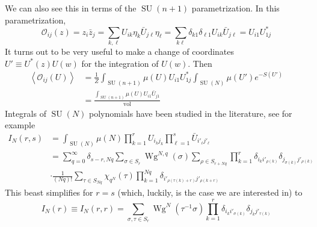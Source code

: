 \documentclass[a4paper,11pt]{article}
\theoremstyle{definition}
\DeclareMathOperator{\SU}{SU}
\DeclareMathOperator{\vol}{vol}
\DeclareMathOperator{\Wg}{Wg}
\newcommand{\OO}{\mathcal O}
\begin{document}
We can also see this in terms of the $\SU(n+1)$ parametrization.
In this parametrization, 
\begin{equation}
  \OO_{ij}(z) = z_i \bar z_j = \sum_{k,\ell} U_{ik} \eta_k \bar U_{j\ell} \eta_{\ell} = \sum_{k\ell} \delta_{k 1}\delta_{\ell 1} U_{ik}\bar U_{j\ell} = U_{i1}U^*_{1j}
\end{equation}
It turns out to be very useful to make a change of coordinates $U' \equiv U^*(z)U(w)$ for the integration of $U(w)$.
Then
\begin{equation}
  \begin{split} 
    \left\langle \OO_{ij}(U) \right\rangle &= \frac{1}{Z} \int_{\SU(n+1)}\mu(U) U_{i1}U^*_{1j} \int_{\SU(N)} \mu(U') e^{-S(U')} \\
    &= \frac{\int_{\SU(n+1)}\mu(U) U_{i1}\bar U_{j1}}{\vol}
  \end{split}
  \label{eq:toy_one_pt_from_SU}
\end{equation}
Integrals of $\SU(N)$ polynomials have been studied in the literature, see for example \cite{Borisenko_Voloshyn_Chelnokov}
\begin{equation}
  \begin{split} 
    I_N(r,s) &= \int_{\SU(N)} \mu(N) \prod_{k=1}^r U_{i_kj_k} \prod_{\ell = 1}^s \bar U_{i'_{\ell} j'_{\ell}} \\
    &= \sum_{q = 0}^{\infty} \delta_{s-r, Nq}\sum_{\sigma \in S_r} \Wg^{N,q}(\sigma)\sum_{\rho\in S_{r+ Nq}}\prod_{k=1}^r \delta_{i_ki'_{\rho(k)}}\delta_{j_{\sigma(k)}j'_{\rho(k)}}\\
    &\cdot \frac{1}{(Nq)!} \sum_{\tau \in S_{Nq}} \chi_{q^N}(\tau) \prod_{k=1}^{Nq} \delta_{i'_{\rho(\tau(k) + r)}j'_{\rho(k + r)}}
  \end{split}
\end{equation}
This beast simplifies for $r = s$ (which, luckily, is the case we are interested in) to 
\begin{equation}
  I_N(r) \equiv I_N(r,r) = \sum_{\sigma,\tau \in S_r} \Wg^N(\tau^{-1}\sigma)\prod_{k=1}^r\delta_{i_ki'_{\sigma(k)}}\delta_{j_kj'_{\tau(k)}}
  \label{eq:SUN_poly_int}
\end{equation}
\end{document}

